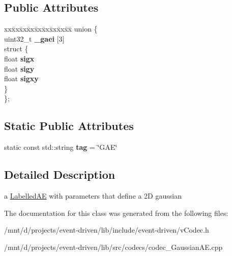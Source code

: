 \subsection*{Public Attributes}
\begin{DoxyCompactItemize}
\item 
\mbox{\label{classev_1_1GaussianAE_a13e0c15248195b159d6b672ea3596611}} 
\begin{tabbing}
xx\=xx\=xx\=xx\=xx\=xx\=xx\=xx\=xx\=\kill
union \{\\
\>uint32\_t {\bfseries \_gaei} \mbox{[}3\mbox{]}\\
\mbox{\label{unionev_1_1GaussianAE_1_1_0D13_aebead89f411b9301f4fdb56ef30ba0c0}} 
\>struct \{\\
\>\>float {\bfseries sigx}\\
\>\>float {\bfseries sigy}\\
\>\>float {\bfseries sigxy}\\
\>\} \\
\}; \\

\end{tabbing}\end{DoxyCompactItemize}
\subsection*{Static Public Attributes}
\begin{DoxyCompactItemize}
\item 
\mbox{\label{classev_1_1GaussianAE_a6d0ea5de274ddd380b056d2ba8b019e2}} 
static const std\+::string {\bfseries tag} = \char`\"{}G\+AE\char`\"{}
\end{DoxyCompactItemize}


\subsection{Detailed Description}
a \hyperlink{classev_1_1LabelledAE}{Labelled\+AE} with parameters that define a 2D gaussian 

The documentation for this class was generated from the following files\+:\begin{DoxyCompactItemize}
\item 
/mnt/d/projects/event-\/driven/lib/include/event-\/driven/v\+Codec.\+h\item 
/mnt/d/projects/event-\/driven/lib/src/codecs/codec\+\_\+\+Gaussian\+A\+E.\+cpp\end{DoxyCompactItemize}
